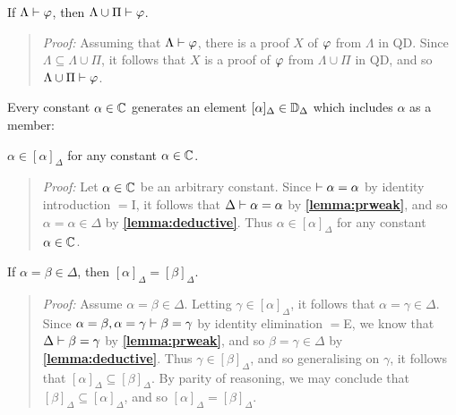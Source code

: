 \begin{Lthm} \label{lemma:prweak}
  If $\Lambda\vdash\varphi$, then $\Lambda\cup\Pi\vdash\varphi$.
\end{Lthm}

\begin{quote} 
  \textit{Proof:} 
  Assuming that $\Lambda\vdash\varphi$, there is a proof $X$ of $\varphi$ from $\Lambda$ in QD.
  Since $\Lambda\subseteq\Lambda\cup\Pi$, it follows that $X$ is a proof of $\varphi$ from $\Lambda\cup\Pi$ in QD, and so $\Lambda\cup\Pi\vdash\varphi$. 
\end{quote}



Every constant $\alpha\in\mathbb{C}$ generates an element $[\alpha]_\Delta\in\mathbb{D}_\Delta$ which includes $\alpha$ as a member: 


\begin{Lthm} \label{lemma:nonempty}
  $\alpha\in[\alpha]_\Delta$ for any constant $\alpha\in\mathbb{C}$.
\end{Lthm}

\begin{quote} 
  \textit{Proof:} 
  Let $\alpha\in\mathbb{C}$ be an arbitrary constant. 
  Since $\vdash \alpha=\alpha$ by identity introduction $=$I, it follows that $\Delta\vdash\alpha=\alpha$ by \textbf{\ref{lemma:prweak}}, and so $\alpha=\alpha\in\Delta$ by \textbf{\ref{lemma:deductive}}.
  Thus $\alpha\in[\alpha]_\Delta$ for any constant $\alpha\in\mathbb{C}$.
\end{quote}

\begin{Lthm} \label{lemma:define}
  If $\alpha=\beta\in\Delta$, then $[\alpha]_\Delta=[\beta]_\Delta$.
\end{Lthm}

\begin{quote} 
  \textit{Proof:}
  Assume $\alpha=\beta\in\Delta$.
  Letting $\gamma\in[\alpha]_\Delta$, it follows that $\alpha=\gamma\in\Delta$.
  Since $\alpha=\beta,\alpha=\gamma\vdash\beta=\gamma$ by identity elimination $=$E, we know that $\Delta\vdash\beta=\gamma$ by \textbf{\ref{lemma:prweak}}, and so $\beta=\gamma\in\Delta$ by \textbf{\ref{lemma:deductive}}. 
  Thus $\gamma\in[\beta]_\Delta$, and so generalising on $\gamma$, it follows that $[\alpha]_\Delta\subseteq[\beta]_\Delta$.
  By parity of reasoning, we may conclude that $[\beta]_\Delta\subseteq[\alpha]_\Delta$, and so $[\alpha]_\Delta=[\beta]_\Delta$.
\end{quote}


